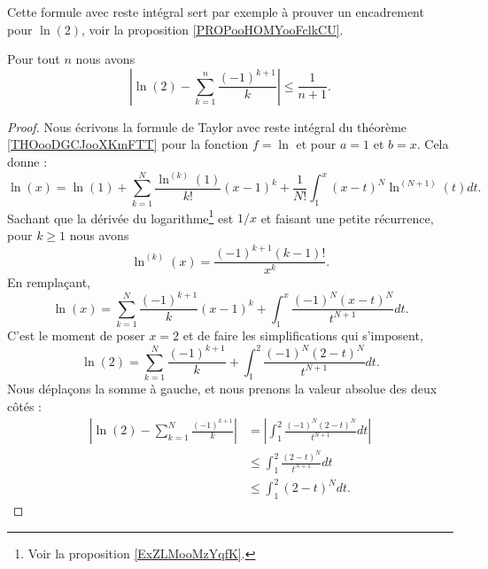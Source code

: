 Cette formule avec reste intégral sert par exemple à prouver un encadrement pour \( \ln(2)\), voir la proposition \ref{PROPooHOMYooFclkCU}.

\begin{proposition}       \label{PROPooHOMYooFclkCU}
	Pour tout \( n\) nous avons
	\begin{equation}
		\left| \ln(2)-\sum_{k=1}^n\frac{ (-1)^{k+1} }{ k } \right|\leq \frac{1}{ n+1 }.
	\end{equation}
\end{proposition}

\begin{proof}
	Nous écrivons la formule de Taylor avec reste intégral du théorème \ref{THOooDGCJooXKmFTT} pour la fonction \( f=\ln\) et pour \( a=1\) et \( b=x\). Cela donne :
	\begin{equation}
		\ln(x)=\ln(1)+\sum_{k=1}^N\frac{ \ln^{(k)}(1) }{ k! }(x-1)^k+\frac{1}{ N! }\int_1^x(x-t)^N\ln^{(N+1)}(t)dt.
	\end{equation}
	Sachant que la dérivée du logarithme\footnote{Voir la proposition \ref{ExZLMooMzYqfK}.} est \( 1/x\) et faisant une petite récurrence, pour \( k\geq 1\) nous avons
	\begin{equation}
		\ln^{(k)}(x)=\frac{ (-1)^{k+1}(k-1)! }{ x^k }.
	\end{equation}
	En remplaçant,
	\begin{equation}
		\ln(x)=\sum_{k=1}^N\frac{ (-1)^{k+1} }{ k }(x-1)^k+\int_1^x\frac{ (-1)^N(x-t)^N }{ t^{N+1} }dt.
	\end{equation}
	C'est le moment de poser \( x=2\) et de faire les simplifications qui s'imposent,
	\begin{equation}
		\ln(2)=\sum_{k=1}^N\frac{ (-1)^{k+1} }{ k }+\int_1^2\frac{ (-1)^N(2-t)^N }{ t^{N+1} }dt.
	\end{equation}
	Nous déplaçons la somme à gauche, et nous prenons la valeur absolue des deux côtés :
	\begin{subequations}
		\begin{align}
			| \ln(2)-\sum_{k=1}^N\frac{ (-1)^{k+1} }{ k } | & =| \int_1^2\frac{ (-1)^N(2-t)^N }{ t^{N+1} }dt |                      \\
			                                                & \leq\int_1^2\frac{ (2-t)^N }{ t^{N+1} }dt \label{SUBEQooZSXEooVcbJpd} \\
			                                                & \leq \int_1^2(2-t)^Ndt       \label{SUBEQooHGZLooGIhoVt}.
		\end{align}

\end{subequations}
\end{proof}
